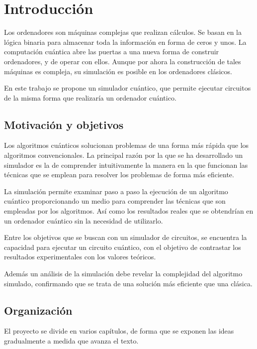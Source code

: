 \chapter{Introducción}

Los ordenadores son máquinas complejas que realizan cálculos. Se basan en la 
lógica binaria para almacenar toda la información en forma de ceros y unos.
%
La computación cuántica abre las puertas a una nueva forma de construir 
ordenadores, y de operar con ellos. Aunque por ahora la construcción de tales 
máquinas es compleja, su simulación es posible en los ordenadores clásicos.

En este trabajo se propone un simulador cuántico, que permite ejecutar circuitos 
de la misma forma que realizaría un ordenador cuántico.

\section{Motivación y objetivos}

Los algoritmos cuánticos solucionan problemas de una forma más rápida que los 
algoritmos convencionales. La principal razón por la que se ha desarrollado un 
simulador es la de comprender intuitivamente la manera en la que funcionan las 
técnicas que se emplean para resolver los problemas de forma más eficiente.

La simulación permite examinar paso a paso la ejecución de un algoritmo cuántico 
proporcionando un medio para comprender las técnicas que son empleadas por los 
algoritmos. Así como los resultados reales que se obtendrían en un ordenador 
cuántico sin la necesidad de utilizarlo.

Entre los objetivos que se buscan con un simulador de circuitos, se encuentra la 
capacidad para ejecutar un circuito cuántico, con el objetivo de contrastar los 
resultados experimentales con los valores teóricos.

Además un análisis de la simulación debe revelar la complejidad del algoritmo 
simulado, confirmando que se trata de una solución más eficiente que una 
clásica.

%

\section{Organización}
El proyecto se divide en varios capítulos, de forma que se exponen las ideas 
gradualmente a medida que avanza el texto.

